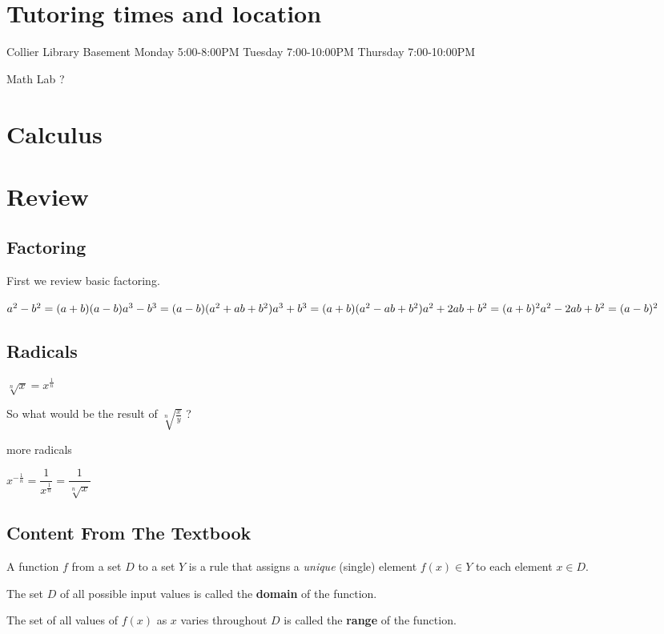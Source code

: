 \documentclass[12pt]{article}
\begin{document}
\section{Tutoring times and location}
Collier Library Basement
Monday 5:00-8:00PM
Tuesday 7:00-10:00PM
Thursday 7:00-10:00PM

Math Lab ?
\section{Calculus}
\section{Review}


\subsection{Factoring}
First we review basic factoring.

\begin{math}
a^2-b^2 = (a+b)(a-b)\\
a^3-b^3 = (a-b)(a^2+ab+b^2)\\
a^3+b^3 = (a+b)(a^2-ab+b^2)\\
a^2+2ab+b^2 = (a+b)^2\\
a^2-2ab+b^2 = (a-b)^2
\end{math}

\subsection{Radicals}

$\sqrt[n]{x} = x^{\frac{1}{n}}$

So what would be the result of $ \sqrt[n]{\frac{x}{y}} $ ?

more radicals

$x^{-\frac{1}{n}} = \dfrac{1}{x^{\frac{1}{n}}} = \dfrac{1}{\sqrt[n]{x}}$

\subsection{Content From The Textbook}
A function $f$ from a set $D$ to a set $Y$ is a rule that assigns a \textit{unique} (single) element $f(x)
\in Y$ to each element $x \in D$.

The set $D$ of all possible input values is called the \textbf{domain} of the function.

The set of all values of $f(x)$ as $x$ varies throughout $D$ is called the \textbf{range} of the function.
\end{document}
